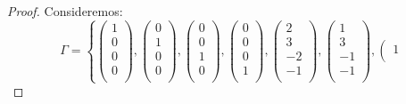 \documentclass[12pt]{report}
\theoremstyle{largebreak}
\begin{document}
    \begin{proof}
        Consideremos:
        \begin{equation*}
            \Gamma=\left\{\left(\begin{array}{c}
                1 \\
                0 \\
                0 \\
                0 \\
            \end{array} \right),\left(\begin{array}{c}
                0 \\
                1 \\
                0 \\
                0 \\
            \end{array} \right),
            \left(\begin{array}{c}
                0 \\
                0 \\
                1 \\
                0 \\
            \end{array} \right),
            \left(\begin{array}{c}
                0 \\
                0 \\
                0 \\
                1 \\
            \end{array} \right),\left(\begin{array}{c}
                2 \\
                3 \\
                -2 \\
                -1 \\
            \end{array} \right),\left(\begin{array}{c}
                1 \\
                3 \\
                -1 \\
                -1 \\
            \end{array} \right),\left(\begin{array}{c}
                1 \\

\end{array}
\end{equation*}
\end{proof}
\end{document}
